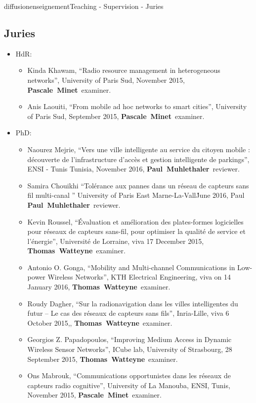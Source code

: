 \documentclass{ra2016}
\newcommand{\paul}  {\textbf{Paul~Muhlethaler}}
\newcommand{\pascale} {\textbf{Pascale~Minet}}
\newcommand{\thomas}  {\textbf{Thomas~Watteyne}}
\begin{document}
\begin{module}{diffusion}{enseignement}{Teaching - Supervision - Juries}
\subsection {Juries}
\begin{itemize}
    \item HdR: 
        \begin{itemize}
            \item Kinda Khawam, ``Radio resource management in heterogeneous networks'', University of Paris Sud, November 2015, \pascale~examiner.
            \item Anis Laouiti, ``From mobile ad hoc networks to smart cities'', University of Paris Sud, September 2015, \pascale~examiner.
        \end{itemize} 
    \item PhD: 
        \begin{itemize}
           \item Naourez Mejrie, ``Vers une ville intelligente au service du citoyen mobile : découverte de l’infrastructure d’accès et gestion intelligente de parkings'', ENSI - Tunis Tunisia, November 2016, \paul~reviewer.
             \item   Samira Chouikhi  ``Tolérance aux pannes dans un réseau de capteurs sans fil multi-canal '' University of Paris East Marne-La-Vall\'  June 2016, Paul \paul~reviewer.
            \item Kevin Roussel, ``\'Evaluation et am\'elioration des plates-formes logicielles pour r\'eseaux de capteurs sans-fil, pour optimiser la qualit\'e de service et l'\'energie'', Universit\'e de Lorraine, viva 17 December 2015, \thomas~examiner.
            \item Antonio O. Gonga, ``Mobility and Multi-channel Communications in Low-power Wireless Networks'', KTH Electrical Engineering, viva on 14 January 2016, \thomas~examiner.
            \item Roudy Dagher, ``Sur la radionavigation dans les villes intelligentes du futur – Le cas des r\'eseaux de capteurs sans fils'', Inria-Lille, viva  6 October 2015,, \thomas~examiner.
            \item Georgios Z. Papadopoulos, ``Improving Medium Access in Dynamic Wireless Sensor Networks'', ICube lab, University of Strasbourg, 28 September 2015, \thomas~examiner.
            \item Ons Mabrouk, ``Communications opportunistes dans les r\'eseaux de capteurs radio cognitive'', University of La Manouba, ENSI, Tunis, November 2015, \pascale~examiner.

\end{itemize}
\end{itemize}
\end{module}
\end{document}
